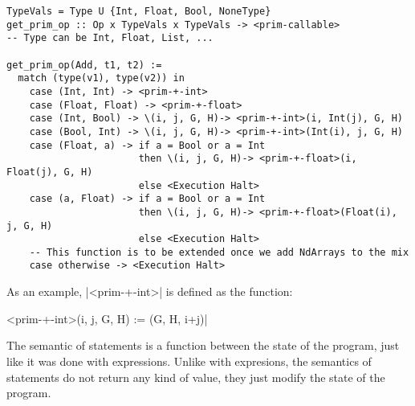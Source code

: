 \begin{verbatim}
TypeVals = Type U {Int, Float, Bool, NoneType}
get_prim_op :: Op x TypeVals x TypeVals -> <prim-callable>
-- Type can be Int, Float, List, ...

get_prim_op(Add, t1, t2) :=
  match (type(v1), type(v2)) in
    case (Int, Int) -> <prim-+-int>
    case (Float, Float) -> <prim-+-float>
    case (Int, Bool) -> \(i, j, G, H)-> <prim-+-int>(i, Int(j), G, H)
    case (Bool, Int) -> \(i, j, G, H)-> <prim-+-int>(Int(i), j, G, H)
    case (Float, a) -> if a = Bool or a = Int
                       then \(i, j, G, H)-> <prim-+-float>(i, Float(j), G, H)
                       else <Execution Halt>
    case (a, Float) -> if a = Bool or a = Int
                       then \(i, j, G, H)-> <prim-+-float>(Float(i), j, G, H)
                       else <Execution Halt>
    -- This function is to be extended once we add NdArrays to the mix
    case otherwise -> <Execution Halt>
\end{verbatim}

As an example, \pycode|<prim-+-int>| is defined
as the function:

\begin{pythoncode}
<prim-+-int>(i, j, G, H) := (G, H, i+j)|
\end{pythoncode}

{}

The semantic of statements is a function between the state of the
program, just like it was done with expressions. Unlike with expresions,
the semantics of statements do not return any kind of value, they just
modify the state of the program.

